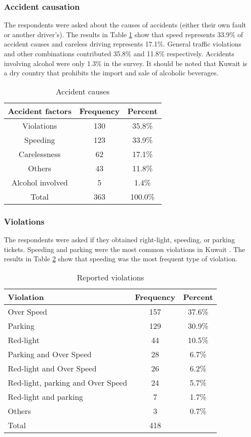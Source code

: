 \documentclass[preprint,12pt,a4paper,authoryear]{elsarticle}
\begin{document}
\subsubsection{Accident causation}
The respondents were asked about the causes of accidents (either their own fault or another driver's). The results in Table \ref{tab:causes} show that speed represents 33.9\% of accident causes and careless driving represents 17.1\%. General traffic violations and other combinations contributed 35.8\% and 11.8\% respectively.  Accidents involving alcohol were only 1.3\% in the survey.  It should be noted that Kuwait is a dry country that prohibits the import and sale of alcoholic beverages. 

\begin{table}[H]
\centering
\caption{Accident causes}
\label{tab:causes}
\begin{tabular}{@{}ccc@{}}
\toprule
\textbf{Accident factors} & \textbf{Frequency} & \textbf{Percent} \\ \midrule
Violations & 130 & 35.8\% \\
Speeding & 123 & 33.9\% \\
Carelessness & 62 & 17.1\% \\
Others & 43 & 11.8\% \\
Alcohol involved & 5 & 1.4\% \\
Total & 363 & 100.0\% \\ \bottomrule
\end{tabular}
\end{table}

\subsubsection{Violations}
The respondents were asked if they obtained right-light, speeding, or parking tickets. Speeding and parking were the most common violations in Kuwait \citep{CSB2017}. The results in Table \ref{tab:violations} show that speeding was the most frequent type of violation.

\begin{table}[H]
\centering
\caption{Reported violations}
\label{tab:violations}
\begin{tabular}{@{}lcc@{}}
\toprule
\textbf{Violation} & \textbf{Frequency} & \textbf{Percent} \\ \midrule
Over Speed & 157 & 37.6\% \\
Parking & 129 & 30.9\% \\
Red-light & 44 & 10.5\% \\
Parking and Over Speed & 28 & 6.7\% \\
Red-light and Over Speed & 26 & 6.2\% \\
Red-light, parking and Over Speed & 24 & 5.7\% \\
Red-light and parking & 7 & 1.7\% \\
Others & 3 & 0.7\% \\
Total & 418 &  \\ \bottomrule
\end{tabular}
\end{table}
\end{document}
